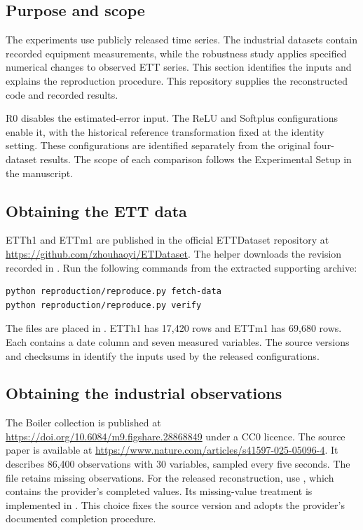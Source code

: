 \subsection*{Purpose and scope}
The experiments use publicly released time series. The industrial datasets contain recorded equipment measurements, while the robustness study applies specified numerical changes to observed ETT series. This section identifies the inputs and explains the reproduction procedure. This repository supplies the reconstructed code and recorded results.

R0 disables the estimated-error input. The ReLU and Softplus configurations enable it, with the historical reference transformation fixed at the identity setting. These configurations are identified separately from the original four-dataset results. The scope of each comparison follows the Experimental Setup in the manuscript.

\subsection*{Obtaining the ETT data}
ETTh1 and ETTm1 are published in the official ETTDataset repository at \url{https://github.com/zhouhaoyi/ETDataset}. The helper downloads the revision recorded in . Run the following commands from the extracted supporting archive:
\begin{lstlisting}
python reproduction/reproduce.py fetch-data
python reproduction/reproduce.py verify
\end{lstlisting}
The files are placed in . ETTh1 has 17,420 rows and ETTm1 has 69,680 rows. Each contains a date column and seven measured variables. The source versions and checksums in  identify the inputs used by the released configurations.

\subsection*{Obtaining the industrial observations}
The Boiler collection is published at \url{https://doi.org/10.6084/m9.figshare.28868849} under a CC0 licence. The source paper is available at \url{https://www.nature.com/articles/s41597-025-05096-4}. It describes 86,400 observations with 30 variables, sampled every five seconds. The file  retains missing observations. For the released reconstruction, use , which contains the provider's completed values. Its missing-value treatment is implemented in . This choice fixes the source version and adopts the provider's documented completion procedure.

